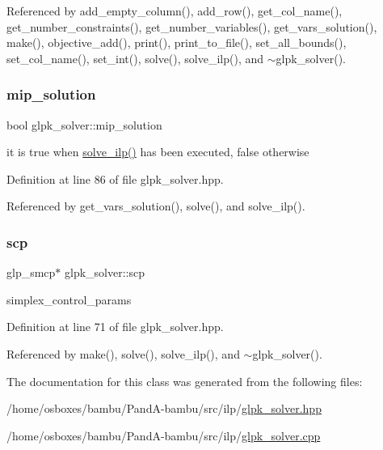 Referenced by add\+\_\+empty\+\_\+column(), add\+\_\+row(), get\+\_\+col\+\_\+name(), get\+\_\+number\+\_\+constraints(), get\+\_\+number\+\_\+variables(), get\+\_\+vars\+\_\+solution(), make(), objective\+\_\+add(), print(), print\+\_\+to\+\_\+file(), set\+\_\+all\+\_\+bounds(), set\+\_\+col\+\_\+name(), set\+\_\+int(), solve(), solve\+\_\+ilp(), and $\sim$glpk\+\_\+solver().

\mbox{\label{classglpk__solver_a060fdd06a6ecad04ab7dccb654e5fefe}} 
\subsubsection{\texorpdfstring{mip\+\_\+solution}{mip\_solution}}
{\footnotesize\ttfamily bool glpk\+\_\+solver\+::mip\+\_\+solution\hspace{0.3cm}{\ttfamily [private]}}



it is true when \hyperlink{classglpk__solver_ad27b82487380811e19a1adc2628f8b07}{solve\+\_\+ilp()} has been executed, false otherwise 



Definition at line 86 of file glpk\+\_\+solver.\+hpp.



Referenced by get\+\_\+vars\+\_\+solution(), solve(), and solve\+\_\+ilp().

\mbox{\label{classglpk__solver_a0466076baa150d2e2debe703ff8e38aa}} 
\subsubsection{\texorpdfstring{scp}{scp}}
{\footnotesize\ttfamily glp\+\_\+smcp$\ast$ glpk\+\_\+solver\+::scp\hspace{0.3cm}{\ttfamily [private]}}



simplex\+\_\+control\+\_\+params 



Definition at line 71 of file glpk\+\_\+solver.\+hpp.



Referenced by make(), solve(), solve\+\_\+ilp(), and $\sim$glpk\+\_\+solver().



The documentation for this class was generated from the following files\+:\begin{DoxyCompactItemize}
\item 
/home/osboxes/bambu/\+Pand\+A-\/bambu/src/ilp/\hyperlink{glpk__solver_8hpp}{glpk\+\_\+solver.\+hpp}\item 
/home/osboxes/bambu/\+Pand\+A-\/bambu/src/ilp/\hyperlink{glpk__solver_8cpp}{glpk\+\_\+solver.\+cpp}\end{DoxyCompactItemize}
